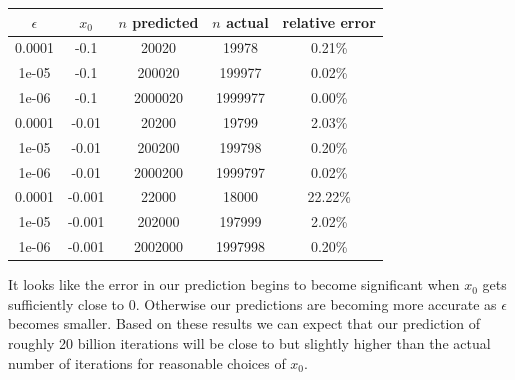 \documentclass[12pt]{article}
\begin{document}
	\begin{center}
		\begin{tabular}{|c|c|c|c|c|}
			\hline
			$\epsilon$&$x_0$&$n$ predicted&$n$ actual&relative error\\ \hline
			0.0001&-0.1&20020&19978&0.21\%\\ \hline
			1e-05&-0.1&200020&199977&0.02\%\\ \hline
			1e-06&-0.1&2000020&1999977&0.00\%\\ \hline
			0.0001&-0.01&20200&19799&2.03\%\\ \hline
			1e-05&-0.01&200200&199798&0.20\%\\ \hline
			1e-06&-0.01&2000200&1999797&0.02\%\\ \hline
			0.0001&-0.001&22000&18000&22.22\%\\ \hline
			1e-05&-0.001&202000&197999&2.02\%\\ \hline
			1e-06&-0.001&2002000&1997998&0.20\%\\ \hline
		\end{tabular}
	\end{center}
	
	It looks like the error in our prediction begins to become significant when $x_0$ gets sufficiently close to $0$. Otherwise our predictions are becoming more accurate as $\epsilon$ becomes smaller. Based on these results we can expect that our prediction of roughly 20 billion iterations will be close to but slightly higher than the actual number of iterations for reasonable choices of $x_0$.
	
	
	
	
\end{document}
